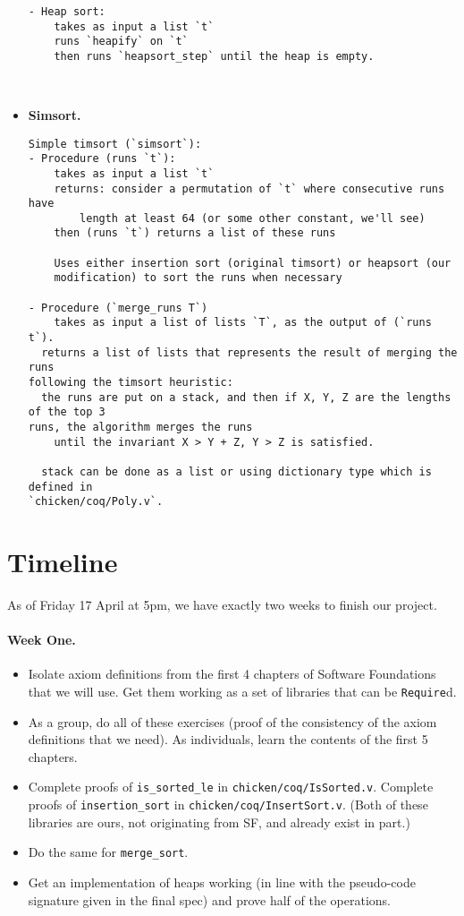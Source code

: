 \documentclass{article}
\begin{document}
\begin{itemize}
\begin{verbatim}
- Heap sort:
	takes as input a list `t`
	runs `heapify` on `t`
	then runs `heapsort_step` until the heap is empty.



\end{verbatim}

  \item \textbf{Simsort.}
\begin{verbatim}
Simple timsort (`simsort`):
- Procedure (runs `t`):
	takes as input a list `t`
	returns: consider a permutation of `t` where consecutive runs have 
        length at least 64 (or some other constant, we'll see)
	then (runs `t`) returns a list of these runs

	Uses either insertion sort (original timsort) or heapsort (our 
	modification) to sort the runs when necessary

- Procedure (`merge_runs T`)
	takes as input a list of lists `T`, as the output of (`runs t`). 
  returns a list of lists that represents the result of merging the runs
following the timsort heuristic:
  the runs are put on a stack, and then if X, Y, Z are the lengths of the top 3
runs, the algorithm merges the runs
	until the invariant X > Y + Z, Y > Z is satisfied.
	
  stack can be done as a list or using dictionary type which is defined in
`chicken/coq/Poly.v`.

\end{verbatim}

\end{itemize}


\section{Timeline}
As of Friday 17 April at 5pm, we have exactly two weeks to finish our project.

\paragraph{Week One.}
\begin{itemize}
  \item
Isolate axiom definitions from the first 4 chapters of Software Foundations that we will use. Get them working as a set of      libraries that can be \verb`Require`d.
\item  As a group, do all of these exercises (proof of the consistency of the axiom definitions that we need). As individuals, learn   the contents of the first 5 chapters.
\item  Complete proofs of \verb`is_sorted_le` in \verb`chicken/coq/IsSorted.v`. Complete proofs of \verb`insertion_sort` in 
  \verb`chicken/coq/InsertSort.v`. (Both of these libraries are ours, not originating from SF, and already exist in part.)
\item  Do the same for \verb`merge_sort`.
\item Get an implementation of heaps working (in line with the pseudo-code signature given in the final spec) and prove half of the   operations.
\end{itemize}
\end{document}
